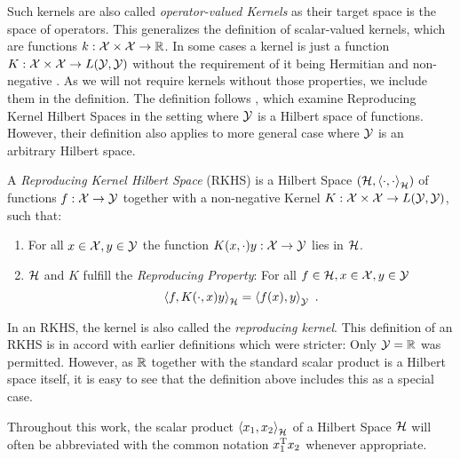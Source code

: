 Such kernels are also called \emph{operator-valued Kernels} as their target space is the space of operators.
This generalizes the definition of scalar-valued kernels, which are functions $k: \mathcal{X} \times \mathcal{X} \rightarrow \mathbb{R}$.
In some cases a kernel is just a function $K: \mathcal{X} \times \mathcal{X} \rightarrow L(\mathcal{Y}, \mathcal{Y})$ without the requirement of it being Hermitian and non-negative \cite{sejdinovic12}.
As we will not require kernels without those properties, we include them in the definition.
The definition follows \citet{kadri16}, which examine Reproducing Kernel Hilbert Spaces in the setting where $\mathcal{Y}$ is a Hilbert space of functions.
However, their definition also applies to more general case where $\mathcal{Y}$ is an arbitrary Hilbert space.
\begin{definition}
	\label{def:rkhs}
	A \emph{Reproducing Kernel Hilbert Space} (RKHS) is a Hilbert Space $(\mathcal{H}, \left<\cdot, \cdot\right>_{\mathcal{H}})$ of functions $f: \mathcal{X} \rightarrow \mathcal{Y}$ together with a non-negative Kernel $K: \mathcal{X} \times \mathcal{X} \rightarrow L(\mathcal{Y}, \mathcal{Y})$, such that:
	\begin{enumerate}
		\item For all $x\in \mathcal{X}, y \in \mathcal{Y}$ the function $K(x, \cdot) y: \mathcal{X} \rightarrow \mathcal{Y}$ lies in $\mathcal{H}$.
		\item $\mathcal{H}$ and $K$ fulfill the \emph{Reproducing Property}: For all $f \in \mathcal{H}, x \in \mathcal{X}, y \in \mathcal{Y}$
		\begin{equation}
			\label{eq:reproducing-property}
			\left< f, K(\cdot, x) y \right>_{\mathcal{H}} = \left< f(x), y\right>_{\mathcal{Y}} \ .
		\end{equation}
	\end{enumerate}
\end{definition}

In an RKHS, the kernel is also called the \emph{reproducing kernel}.
This definition of an RKHS is in accord with earlier definitions \cite{berlinet04, sejdinovic12} which were stricter:
Only $\mathcal{Y} = \mathbb{R}$ was permitted.
However, as $\mathbb{R}$ together with the standard scalar product is a Hilbert space itself, it is easy to see that the definition above includes this as a special case.

Throughout this work, the scalar product $\left< x_1, x_2 \right>_{\mathcal{H}}$ of a Hilbert Space $\mathcal{H}$ will often be abbreviated with the common notation $x_1^{\mathrm{T}} x_2$ whenever appropriate.

